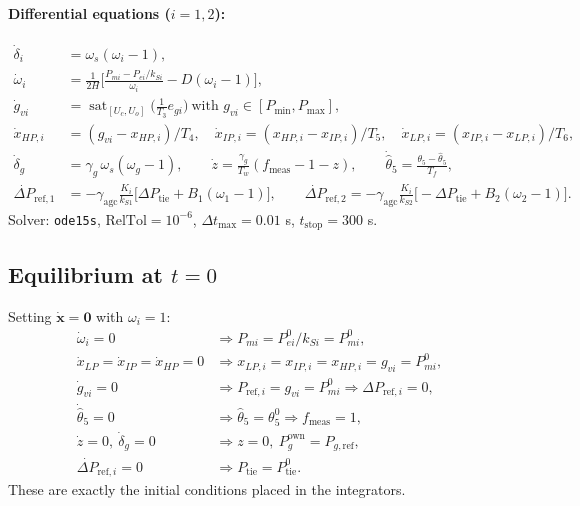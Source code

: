 \documentclass[11pt,a4paper]{article}
\numberwithin{equation}{section}
\newcommand{\sat}{\operatorname{sat}}
\begin{document}
\paragraph{Differential equations ($i=1,2$):}
\begin{align}
\dot\delta_i &= \omega_s(\omega_i-1),\\
\dot\omega_i &= \frac{1}{2H}\Big[\frac{P_{mi}-P_{ei}/k_{Si}}{\omega_i} - D(\omega_i-1)\Big],\\
\dot g_{vi} &= \sat_{[U_c,U_o]}\Big(\frac{1}{T_3}e_{gi}\Big)\ \text{with } g_{vi}\in[P_{\min},P_{\max}],\\
\dot x_{HP,i} &= (g_{vi}-x_{HP,i})/T_4,\quad
\dot x_{IP,i} = (x_{HP,i}-x_{IP,i})/T_5,\quad
\dot x_{LP,i} = (x_{IP,i}-x_{LP,i})/T_6,\\
\dot\delta_g &= \gamma_g\,\omega_s(\omega_g-1),\qquad
\dot z = \frac{\gamma_g}{T_w}(f_{\text{meas}}-1-z),\qquad
\dot{\hat\theta}_5 = \frac{\theta_5-\hat\theta_5}{T_f},\\
\dot{\Delta P}_{\text{ref},1} &= -\gamma_{\text{agc}}\frac{K_i}{k_{S1}}\big[\Delta P_{\text{tie}} + B_1(\omega_1-1)\big],\qquad
\dot{\Delta P}_{\text{ref},2} = -\gamma_{\text{agc}}\frac{K_i}{k_{S2}}\big[-\Delta P_{\text{tie}} + B_2(\omega_2-1)\big].
\end{align}
Solver: \texttt{ode15s}, $\text{RelTol}=10^{-6}$, $\Delta t_{\max}=0.01$ s, $t_{\text{stop}}=300$ s.

\subsection{Equilibrium at $t=0$}
Setting $\dot{\bm x}=\bm 0$ with $\omega_i=1$:
\begin{align}
\dot\omega_i = 0 &\Rightarrow P_{mi} = P_{ei}^0/k_{Si} = P_{mi}^0,\\
\dot x_{LP}=\dot x_{IP}=\dot x_{HP}=0 &\Rightarrow x_{LP,i}=x_{IP,i}=x_{HP,i}=g_{vi}=P_{mi}^0,\\
\dot g_{vi}=0 &\Rightarrow P_{\text{ref},i} = g_{vi} = P_{mi}^0\Rightarrow \Delta P_{\text{ref},i}=0,\\
\dot{\hat\theta}_5=0 &\Rightarrow \hat\theta_5=\theta_5^0\Rightarrow f_{\text{meas}}=1,\\
\dot z = 0,\ \dot\delta_g=0 &\Rightarrow z=0,\ P_g^{\text{own}} = P_{g,\text{ref}},\\
\dot{\Delta P}_{\text{ref},i}=0 &\Rightarrow P_{\text{tie}} = P_{\text{tie}}^0 .
\end{align}
These are exactly the initial conditions placed in the integrators.
\end{document}
